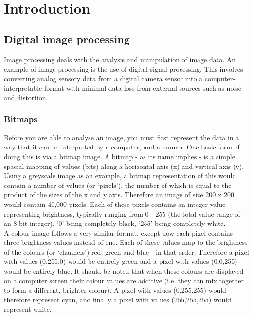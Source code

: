 \chapter{Introduction}

  \section{Digital image processing}
    Image processing deals with the analysis and manipulation of image data. An example of image processing is the use of digital signal processing. This involves converting analog sensory data from a digital camera sensor into a computer-interpretable format with minimal data loss from external sources such as noise and distortion.\\

    \subsection{Bitmaps}
      Before you are able to analyse an image, you must first represent the data in a way that it can be interpreted by a computer, and a human. One basic form of doing this is via a bitmap image. A bitmap - as its name implies - is a simple spacial mapping of values (bits) along a horizontal axis (x) and vertical axis (y). Using a greyscale image as an example, a bitmap representation of this would contain a number of values (or ‘pixels’), the number of which is equal to the product of the sizes of the x and y axis. Therefore an image of size 200 x 200 would contain 40,000 pixels. Each of these pixels contains an integer value representing brightness, typically ranging from 0 - 255 (the total value range of an 8-bit integer), ‘0’ being completely black, ‘255’ being completely white.\\

      A colour image follows a very similar format, except now each pixel contains three brightness values instead of one. Each of these values map to the brightness of the colours (or ‘channels’) red, green and blue - in that order. Therefore a pixel with values (0,255,0) would be entirely green and a pixel with values (0,0,255) would be entirely blue. It should be noted that when these colours are displayed on a computer screen their colour values are additive (i.e. they can mix together to form a different, brighter colour). A pixel with values (0,255,255) would therefore represent cyan, and finally a pixel with values (255,255,255) would represent white.

